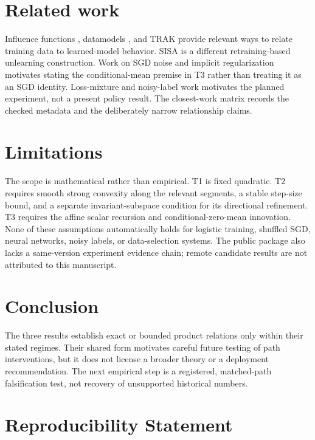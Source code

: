 \documentclass{article}
\begin{document}
\section{Related work}
\label{sec:related}

Influence functions \citep{koh2017understanding}, datamodels
\citep{ilyas2022datamodels}, and TRAK \citep{park2023trak} provide relevant
ways to relate training data to learned-model behavior. SISA
\citep{bourtoule2021sisa} is a different retraining-based unlearning
construction. Work on SGD noise and implicit regularization
\citep{mandt2017sgd,smith2017bayesian,smith2021origin} motivates stating the
conditional-mean premise in T3 rather than treating it as an SGD identity.
Loss-mixture and noisy-label work \citep{arazo2019unsupervised,jiang2018mentornet,
han2018coteaching,wei2022cifar10n} motivates the planned experiment, not a
present policy result. The closest-work matrix records the checked metadata
and the deliberately narrow relationship claims.

\section{Limitations}
\label{sec:limitations}

The scope is mathematical rather than empirical. T1 is fixed quadratic. T2
requires smooth strong convexity along the relevant segments, a stable
step-size bound, and a separate invariant-subspace condition for its
directional refinement. T3 requires the affine scalar recursion and
conditional-zero-mean innovation. None of these assumptions automatically
holds for logistic training, shuffled SGD, neural networks, noisy labels, or
data-selection systems. The public package also lacks a same-version
experiment evidence chain; remote candidate results are not attributed to
this manuscript.

\section{Conclusion}

The three results establish exact or bounded product relations only within
their stated regimes. Their shared form motivates careful future testing of
path interventions, but it does not license a broader theory or a deployment
recommendation. The next empirical step is a registered, matched-path
falsification test, not recovery of unsupported historical numbers.

\section*{Reproducibility Statement}
\end{document}

